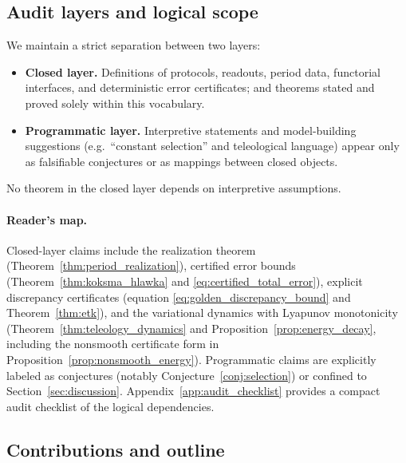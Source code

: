 \subsection{Audit layers and logical scope}
\label{sec:intro_audit_layers}

We maintain a strict separation between two layers:
\begin{itemize}
\item \textbf{Closed layer.} Definitions of protocols, readouts, period data, functorial interfaces, and deterministic error certificates; and theorems stated and proved solely within this vocabulary.
\item \textbf{Programmatic layer.} Interpretive statements and model-building suggestions (e.g.\ ``constant selection'' and teleological language) appear only as falsifiable conjectures or as mappings between closed objects.
\end{itemize}
No theorem in the closed layer depends on interpretive assumptions.

\paragraph{Reader's map.}
Closed-layer claims include the realization theorem (Theorem~\ref{thm:period_realization}), certified error bounds (Theorem~\ref{thm:koksma_hlawka} and \eqref{eq:certified_total_error}), explicit discrepancy certificates (equation \eqref{eq:golden_discrepancy_bound} and Theorem~\ref{thm:etk}), and the variational dynamics with Lyapunov monotonicity (Theorem~\ref{thm:teleology_dynamics} and Proposition~\ref{prop:energy_decay}, including the nonsmooth certificate form in Proposition~\ref{prop:nonsmooth_energy}).
Programmatic claims are explicitly labeled as conjectures (notably Conjecture~\ref{conj:selection}) or confined to Section~\ref{sec:discussion}.
Appendix~\ref{app:audit_checklist} provides a compact audit checklist of the logical dependencies.

\subsection{Contributions and outline}
\label{sec:intro_contributions}

